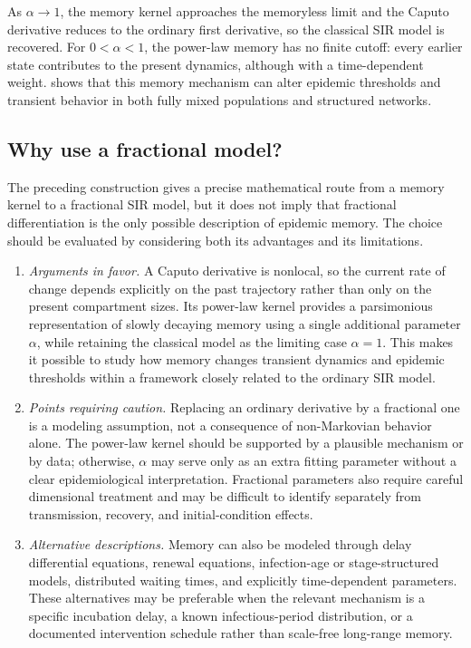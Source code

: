 \documentclass[00-main.tex]{subfiles}
\begin{document}
As $\alpha\to 1$, the memory kernel approaches the memoryless limit and the Caputo derivative reduces to the ordinary first derivative, so the classical SIR model is recovered.
For $0<\alpha<1$, the power-law memory has no finite cutoff: every earlier state contributes to the present dynamics, although with a time-dependent weight.
\cite{Sa17} shows that this memory mechanism can alter epidemic thresholds and transient behavior in both fully mixed populations and structured networks.


\subsection{Why use a fractional model?}

The preceding construction gives a precise mathematical route from a memory kernel to a fractional SIR model, but it does not imply that fractional differentiation is the only possible description of epidemic memory.
The choice should be evaluated by considering both its advantages and its limitations.
\begin{enumerate}
    \item \textit{Arguments in favor.}
    A Caputo derivative is nonlocal, so the current rate of change depends explicitly on the past trajectory rather than only on the present compartment sizes.
    Its power-law kernel provides a parsimonious representation of slowly decaying memory using a single additional parameter $\alpha$, while retaining the classical model as the limiting case $\alpha=1$.
    This makes it possible to study how memory changes transient dynamics and epidemic thresholds within a framework closely related to the ordinary SIR model.

    \item \textit{Points requiring caution.}
    Replacing an ordinary derivative by a fractional one is a modeling assumption, not a consequence of non-Markovian behavior alone.
    The power-law kernel should be supported by a plausible mechanism or by data; otherwise, $\alpha$ may serve only as an extra fitting parameter without a clear epidemiological interpretation.
    Fractional parameters also require careful dimensional treatment and may be difficult to identify separately from transmission, recovery, and initial-condition effects.

    \item \textit{Alternative descriptions.}
    Memory can also be modeled through delay differential equations, renewal equations, infection-age or stage-structured models, distributed waiting times, and explicitly time-dependent parameters.
    These alternatives may be preferable when the relevant mechanism is a specific incubation delay, a known infectious-period distribution, or a documented intervention schedule rather than scale-free long-range memory.
\end{enumerate}
\end{document}
